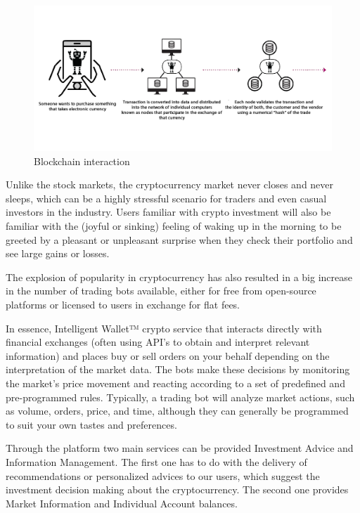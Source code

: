 \documentclass[	DIV=calc,%
							paper=letter,%
							fontsize=12pt%
                            ]{scrartcl}	 					%
\begin{document}
\begin{figure}[H]
\centering
\includegraphics[scale=0.40]{img/Crypto.png}
\caption{Blockchain interaction }
\label{Crypto}
\end{figure}

Unlike the stock markets, the cryptocurrency market never closes and never sleeps, which can be a highly stressful scenario for traders and even casual investors in the industry. Users familiar with crypto investment will also be familiar with the (joyful or sinking) feeling of waking up in the morning to be greeted by a pleasant or unpleasant surprise when they check their portfolio and see large gains or losses.

The explosion of popularity in cryptocurrency has also resulted in a big increase in the number of trading bots available, either for free from open-source platforms or licensed to users in exchange for flat fees. 

In essence, Intelligent Wallet™ crypto service that interacts directly with financial exchanges (often using API’s to obtain and interpret relevant information) and places buy or sell orders on your behalf depending on the interpretation of the market data. The bots make these decisions by monitoring the market’s price movement and reacting according to a set of predefined and pre-programmed rules. Typically, a trading bot will analyze market actions, such as volume, orders, price, and time, although they can generally be programmed to suit your own tastes and preferences. 


Through the platform two main services can be provided\: Investment Advice and Information Management. The first one has to do with the delivery of recommendations or personalized advices to our users, which suggest the investment decision making about the cryptocurrency. The second one provides Market Information and Individual Account balances.
\end{document}
